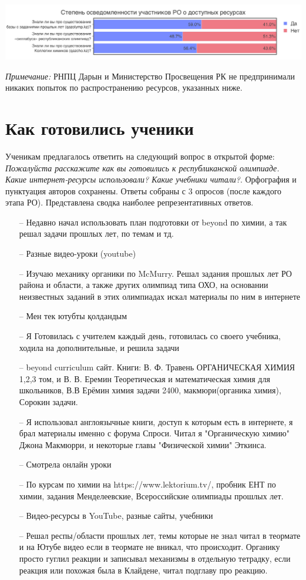 \includegraphics[width=\linewidth]{../export/pdf/demographics/shortquestions.pdf}

\textit{Примечание:} РНПЦ Дарын и Министерство Просвещения РК не предпринимали никаких попыток по распространению ресурсов, указанных ниже.

\section{Как готовились ученики}

Ученикам предлагалось ответить на следующий вопрос в открытой форме: \textit{Пожалуйста расскажите как вы готовились к республиканской олимпиаде. Какие интернет-ресурсы использовали? Какие учебники читали?}. Орфография и пунктуация авторов сохранены. Ответы собраны с 3 опросов (после каждого этапа РО). Представлена сводка наиболее репрезентативных ответов.

\begin{itemize}
    \itemsep-0.2em
    \item[--] Недавно начал использовать план подготовки от beyond по химии, а так решал задачи прошлых лет, по темам и тд.
    \item[--] Разные видео-уроки (youtube)
    \item[--] Изучаю механику органики по McMurry. Решал задания прошлых лет РО района и области, а также других олимпиад типа ОХО, на основании неизвестных заданий в этих олимпиадах искал материалы по ним в интернете
    \item[--] Мен тек ютубты қолдандым
    \item[--] Я Готовилась с учителем каждый день, готовилась со своего учебника, ходила на дополнительные, и решила задачи
    \item[--] beyond curriculum сайт. Книги: В. Ф. Травень ОРГАНИЧЕСКАЯ ХИМИЯ 1,2,3 том, и В. В. Еремин Теоретическая и математическая химия для школьников, В.В Ерёмин химия задачи 2400, макмюри(органика химия), Сорокин задачи.
    \item[--] Я использовал англоязычные книги, доступ к которым есть в интернете, я брал материалы именно с форума Спроси. Читал я "Органическую химию" Джона Макмюрри, и некоторые главы "Физической химии" Эткинса.
    \item[--] Смотрела онлайн уроки
    \item[--] По курсам по химии на https://www.lektorium.tv/, пробник ЕНТ по химии, задания Менделеевские, Всероссийские олимпиады прошлых лет.
    \item[--] Видео-ресурсы в YouTube, разные сайты, учебники
    \item[--] Решал респы/области прошлых лет, темы которые не знал читал в теормате и на Ютубе видео если в теормате не вникал, что происходит. Органику просто гуглил реакции и записывал механизмы в отдельную тетрадку, если реакция или похожая была в Клайдене, читал подглаву про реакцию.
\end{itemize}

